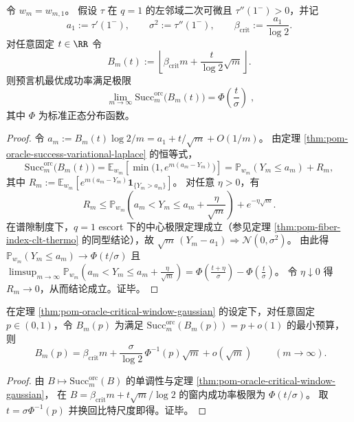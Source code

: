 \begin{theorem}[临界预算窗的高斯极限：\texorpdfstring{$B=\beta_{\mathrm{crit}}m+O(\sqrt m)$}{B=beta m+O(sqrt m)}]\label{thm:pom-oracle-critical-window-gaussian}
令 \(w_m=w_{m,1}\)。
假设 \(\tau\) 在 \(q=1\) 的左邻域二次可微且 \(\tau''(1^-)>0\)，并记
\[
a_1:=\tau'(1^-),\qquad \sigma^2:=\tau''(1^-),\qquad \beta_{\mathrm{crit}}:=\frac{a_1}{\log 2}.
\]
对任意固定 \(t\in\RR\) 令
\[
B_m(t):=\left\lfloor \beta_{\mathrm{crit}}m+\frac{t}{\log 2}\sqrt m\right\rfloor.
\]
则预言机最优成功率满足极限
\[
\boxed{\;
\lim_{m\to\infty}\mathrm{Succ}^{\mathrm{orc}}_m\bigl(B_m(t)\bigr)
=\Phi\!\left(\frac{t}{\sigma}\right)\;},
\]
其中 \(\Phi\) 为标准正态分布函数。
\end{theorem}
\begin{proof}
令 \(a_m:=B_m(t)\log 2/m=a_1+t/\sqrt m+O(1/m)\)。
由定理 \ref{thm:pom-oracle-success-variational-laplace} 的恒等式，
\[
\mathrm{Succ}^{\mathrm{orc}}_m\bigl(B_m(t)\bigr)
=\mathbb{E}_{w_m}\!\left[\min\bigl(1,e^{m(a_m-Y_m)}\bigr)\right]
=\mathbb{P}_{w_m}(Y_m\le a_m)+R_m,
\]
其中
\(
R_m:=\mathbb{E}_{w_m}[e^{m(a_m-Y_m)}\mathbf{1}_{\{Y_m>a_m\}}]
\)。
对任意 \(\eta>0\)，有
\[
R_m\le \mathbb{P}_{w_m}\!\left(a_m<Y_m\le a_m+\frac{\eta}{\sqrt m}\right)+e^{-\eta\sqrt m}.
\]
在谱隙制度下，\(q=1\) escort 下的中心极限定理成立（参见定理 \ref{thm:pom-fiber-index-clt-thermo} 的同型结论），故
\(
\sqrt m\,(Y_m-a_1)\Rightarrow \mathcal{N}(0,\sigma^2)
\)。
由此得
\(
\mathbb{P}_{w_m}(Y_m\le a_m)\to \Phi(t/\sigma)
\)
且
\(
\limsup_{m\to\infty}\mathbb{P}_{w_m}\!\left(a_m<Y_m\le a_m+\frac{\eta}{\sqrt m}\right)
=\Phi\!\left(\frac{t+\eta}{\sigma}\right)-\Phi\!\left(\frac{t}{\sigma}\right)
\)。
令 \(\eta\downarrow 0\) 得 \(R_m\to 0\)，从而结论成立。证毕。
\end{proof}

\begin{corollary}\label{cor:pom-oracle-critical-window-bit-inversion}
在定理 \ref{thm:pom-oracle-critical-window-gaussian} 的设定下，对任意固定 \(p\in(0,1)\)，令 \(B_m(p)\) 为满足
\(
\mathrm{Succ}^{\mathrm{orc}}_m(B_m(p))=p+o(1)
\)
的最小预算，则
\[
\boxed{\;
B_m(p)=\beta_{\mathrm{crit}}m+\frac{\sigma}{\log 2}\,\Phi^{-1}(p)\sqrt m+o(\sqrt m)\;}
\qquad(m\to\infty).
\]
\end{corollary}
\begin{proof}
由 \(B\mapsto \mathrm{Succ}^{\mathrm{orc}}_m(B)\) 的单调性与定理 \ref{thm:pom-oracle-critical-window-gaussian}，
在 \(B=\beta_{\mathrm{crit}}m+t\sqrt m/\log2\) 的窗内成功率极限为 \(\Phi(t/\sigma)\)。
取 \(t=\sigma\Phi^{-1}(p)\) 并换回比特尺度即得。证毕。
\end{proof}


